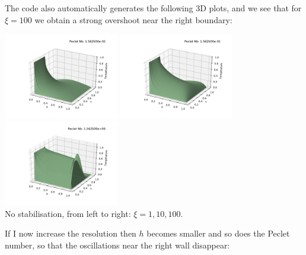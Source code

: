 The code also automatically generates the following 3D plots, and we see that for $\xi=100$
we obtain a strong overshoot near the right boundary:

\begin{center}
\includegraphics[width=5cm]{python_codes/fieldstone_65/results/exp3/solution1.pdf}
\includegraphics[width=5cm]{python_codes/fieldstone_65/results/exp3/solution10.pdf}
\includegraphics[width=5cm]{python_codes/fieldstone_65/results/exp3/solution100.pdf}\\
{\captionfont No stabilisation, from left to right: $\xi=1,10,100$.}
\end{center}

If I now increase the resolution then $h$ becomes smaller and so does the Peclet number, so that 
the oscillations near the right wall disappear:

